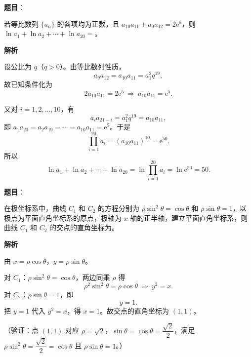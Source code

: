 \begin{answer}

\textbf{题目}：

若等比数列 $\{a_n\}$ 的各项均为正数，且 $a_{10}a_{11}+a_9a_{12}=2\mathrm e^5$，则 $\ln a_1+\ln a_2+\cdots+\ln a_{20}=$\gkblank{}。

\textbf{解析}

设公比为 $q$（$q>0$）。由等比数列性质，
\nopagebreak[4]
\[a_9a_{12}=a_{10}a_{11}=a_1^2q^{19},\]
故已知条件化为
\nopagebreak[4]
\[2a_{10}a_{11}=2\mathrm e^5\ \Longrightarrow\ a_{10}a_{11}=\mathrm e^5.\]

又对 $i=1,2,\ldots,10$，有
\nopagebreak[4]
\[a_i a_{21-i}=a_1^2q^{19}=a_{10}a_{11},\]
即 $a_1a_{20}=a_2a_{19}=\cdots=a_{10}a_{11}=\mathrm e^5$。于是
\nopagebreak[4]
\[\prod_{i=1}^{20}a_i=(a_{10}a_{11})^{10}=\mathrm e^{50}.\]
所以
\nopagebreak[4]
\[\ln a_1+\ln a_2+\cdots+\ln a_{20}
=\ln\prod_{i=1}^{20}a_i=\ln\mathrm e^{50}=50.\]


\end{answer}
\begin{answer}

\textbf{题目}：

在极坐标系中，曲线 $C_1$ 和 $C_2$ 的方程分别为 $\rho\sin^2\theta=\cos\theta$ 和 $\rho\sin\theta=1$，以极点为平面直角坐标系的原点，极轴为 $x$ 轴的正半轴，建立平面直角坐标系，则曲线 $C_1$ 和 $C_2$ 的交点的直角坐标为\gkblank{}。

\textbf{解析}

由 $x=\rho\cos\theta$，$y=\rho\sin\theta$。

对 $C_1$：$\rho\sin^2\theta=\cos\theta$，两边同乘 $\rho$ 得
\nopagebreak[4]
\[\rho^2\sin^2\theta=\rho\cos\theta\ \Longrightarrow\ y^2=x.\]
对 $C_2$：$\rho\sin\theta=1$，即
\nopagebreak[4]
\[y=1.\]
把 $y=1$ 代入 $y^2=x$，得 $x=1$。故交点的直角坐标为 $(1,1)$。

（验证：点 $(1,1)$ 对应 $\rho=\sqrt2$，$\sin\theta=\cos\theta=\dfrac{\sqrt2}{2}$，满足 $\rho\sin^2\theta=\dfrac{\sqrt2}{2}=\cos\theta$ 且 $\rho\sin\theta=1$。）


\end{answer}
